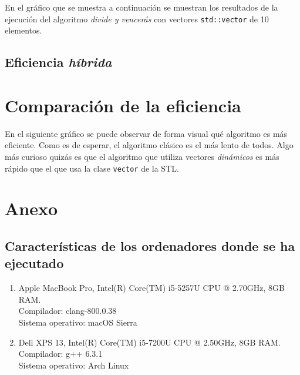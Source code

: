 \documentclass[11pt]{article}
\begin{document}
En el gráfico que se muestra a continuación se muestran los resultados de la
ejecución del algoritmo \textit{divide y vencerás} con vectores
\texttt{std::vector} de 10 elementos.

\begin{center}
	
\end{center}

\subsection*{Eficiencia \textit{híbrida}}

\section*{Comparación de la eficiencia}

En el siguiente gráfico se puede observar de forma visual qué algoritmo es más
eficiente. Como es de esperar, el algoritmo clásico es el más lento de
todos. Algo más curioso quizás es que el algoritmo que utiliza vectores
\textit{dinámicos} es más rápido que el que usa la clase \texttt{vector} de la STL.

\begin{center}
	
\end{center}




\newpage

\section*{Anexo}
\subsection*{Características de los ordenadores donde se ha ejecutado}

\vspace{0.5em}

\begin{enumerate}
\item Apple MacBook Pro, Intel(R) Core(TM) i5-5257U CPU @ 2.70GHz, 8GB RAM.\\  Compilador: clang-800.0.38 \\
  Sistema operativo: macOS Sierra
\item Dell XPS 13, Intel(R) Core(TM) i5-7200U CPU @ 2.50GHz, 8GB RAM.\\
  Compilador: g++ 6.3.1\\
  Sistema operativo: Arch Linux
\end{enumerate}
\end{document}
